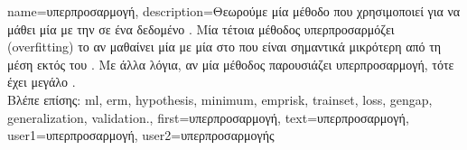 {name={\foreignlanguage{greek}{υπερπροσαρμογή}},
	description={\foreignlanguage{greek}{Θεωρούμε μία μέθοδο}  
		 \foreignlanguage{greek}{που χρησιμοποιεί}  \foreignlanguage{greek}{για να μάθει μία} 
		 \foreignlanguage{greek}{με την}   \foreignlanguage{greek}{σε ένα 
		δεδομένο} . \foreignlanguage{greek}{Μία τέτοια μέθοδος υπερπροσαρμόζει} (overfitting) \foreignlanguage{greek}{το} 
		 \foreignlanguage{greek}{αν μαθαίνει μία}  \foreignlanguage{greek}{με μία} 
		 \foreignlanguage{greek}{στο}  \foreignlanguage{greek}{που είναι σημαντικά μικρότερη από τη μέση} 
		 \foreignlanguage{greek}{εκτός του} . \foreignlanguage{greek}{Με άλλα λόγια, αν μία μέθοδος} 
		 \foreignlanguage{greek}{παρουσιάζει υπερπροσαρμογή, τότε έχει μεγάλο} .
		\\
		\foreignlanguage{greek}{Βλέπε επίσης:} \gls{ml}, \gls{erm}, \gls{hypothesis}, \gls{minimum}, \gls{emprisk}, \gls{trainset}, \gls{loss}, 
		\gls{gengap}, \gls{generalization}, \gls{validation}.},
	first={\foreignlanguage{greek}{υπερπροσαρμογή}},
	text={\foreignlanguage{greek}{υπερπροσαρμογή}},
	user1={\foreignlanguage{greek}{υπερπροσαρμογή}}, %
    	user2={\foreignlanguage{greek}{υπερπροσαρμογής}} %
}

